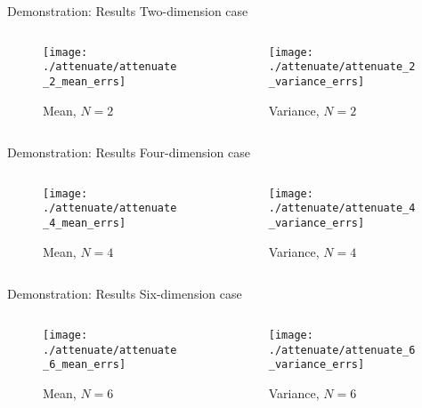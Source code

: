 \documentclass[t,9pt,svgnames]{beamer}
\begin{document}
\begin{frame}{Demonstration: Results}
  Two-dimension case
  \begin{columns}
    \begin{column}{0.5\textwidth}
      \begin{figure}
        \centering
        \texttt{[image: ./attenuate/attenuate\_2\_mean\_errs]}
        \caption{Mean, $N=2$}
      \end{figure}
    \end{column}
    \begin{column}{0.5\textwidth}
      \begin{figure}
        \centering
        \texttt{[image: ./attenuate/attenuate\_2\_variance\_errs]}
        \caption{Variance, $N=2$}
      \end{figure}
    \end{column}
  \end{columns}
\end{frame}

\begin{frame}{Demonstration: Results}
  Four-dimension case
  \begin{columns}
    \begin{column}{0.5\textwidth}
      \begin{figure}
        \centering
        \texttt{[image: ./attenuate/attenuate\_4\_mean\_errs]}
        \caption{Mean, $N=4$}
      \end{figure}
    \end{column}
    \begin{column}{0.5\textwidth}
      \begin{figure}
        \centering
        \texttt{[image: ./attenuate/attenuate\_4\_variance\_errs]}
        \caption{Variance, $N=4$}
      \end{figure}
    \end{column}
  \end{columns}
\end{frame}

\begin{frame}{Demonstration: Results}
  Six-dimension case
  \begin{columns}
    \begin{column}{0.5\textwidth}
      \begin{figure}
        \centering
        \texttt{[image: ./attenuate/attenuate\_6\_mean\_errs]}
        \caption{Mean, $N=6$}
      \end{figure}
    \end{column}
    \begin{column}{0.5\textwidth}
      \begin{figure}
        \centering
        \texttt{[image: ./attenuate/attenuate\_6\_variance\_errs]}
        \caption{Variance, $N=6$}
      \end{figure}
    \end{column}
  \end{columns}
\end{frame}
\end{document}
